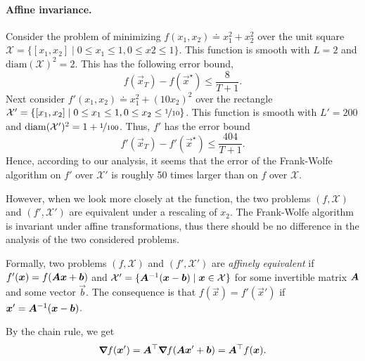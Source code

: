 \paragraph{Affine invariance.}

Consider the problem of minimizing $f(x_1, x_2) \doteq x_1^2 + x_2^2$ over the unit square
$\mathcal{X} = \{ [x_1,x_2] \mid 0 \leq x_1 \leq 1, 0 \leq x2 \leq 1 \}$. This function is smooth
with $L=2$ and $\mathrm{diam}(\mathcal{X})^2 = 2$. This has the following error bound, \[
    f(\vec{x}_T) - f(\vec{x}^\star) \leq \frac{8}{T+1}.
\]
Next consider $f'(x_1, x_2) \doteq x_1^2 + (10x_2)^2$ over the rectangle $\mathcal{X}' = \{ [x_1,
            x_2] \mid 0 \leq x_1 \leq 1, 0\leq x_2 \leq \nicefrac{1}{10} \}$. This function is smooth with $L'
    = 200$ and $\mathrm{diam}(\mathcal{X}')^2 = 1 + \nicefrac{1}{100}$. Thus, $f'$ has the error bound \[
    f'(\vec{x}_T) - f'(\vec{x}^\star) \leq \frac{404}{T+1}.
\]
Hence, according to our analysis, it seems that the error of the Frank-Wolfe algorithm on $f'$ over
$\mathcal{X}'$ is roughly 50 times larger than on $f$ over $\mathcal{X}$.

However, when we look more closely at the function, the two problems $(f,\mathcal{X})$ and
$(f',\mathcal{X}')$ are equivalent under a rescaling of $x_2$. The Frank-Wolfe algorithm is
invariant under affine transformations, thus there should be no difference in the analysis of the
two considered problems.

Formally, two problems $(f, \mathcal{X})$ and $(f', \mathcal{X}')$ are \textit{affinely equivalent}
if $f'(\bm{x}) = f(\bm{A} \bm{x} + \bm{b})$ and $\mathcal{X}' = \{ \bm{A}^{-1}(\bm{x} -
    \bm{b}) \mid \bm{x} \in \mathcal{X} \}$ for some invertible matrix $\bm{A}$ and some vector
$\vec{b}$. The consequence is that $f(\vec{x}) = f'(\vec{x}')$ if $\bm{x}' = \bm{A}^{-1}
    (\bm{x} - \bm{b})$.

By the chain rule, we get \[
    \bm{\nabla}_{\! } f(\bm{x}') = \bm{A}^\top \bm{\nabla}_{\! } f(\bm{A} \bm{x}' + \bm{b}) = \bm{A}^\top f(\bm{x}).
\]

